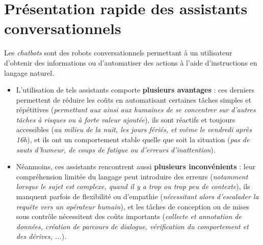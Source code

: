 	\minitoc
	
	
	\newpage
	\section{Présentation rapide des assistants conversationnels}
	\label{annex:B.1-ANNEXE-CHATBOTS-PRESENTATION}
	
		Les \textit{chatbots} sont des robots conversationnels permettant à un utilisateur d'obtenir des informations ou d'automatiser des actions à l'aide d'instructions en langage naturel.
		\begin{itemize}
			\item[\faThumbsUp] L'utilisation de tels assistants comporte \textbf{plusieurs avantages} :
			ces derniers permettent de réduire les coûts en automatisant certaines tâches simples et répétitives (\textit{permettant aux ainsi aux humaines de se concentrer sur d'autres tâches à risques ou à forte valeur ajoutée}),
			ils sont réactifs et toujours accessibles (\textit{au milieu de la nuit, les jours fériés, et même le vendredi après 16h}),
			et ils ont un comportement stable quelle que soit la situation (\textit{pas de sauts d'humeur, de coups de fatigue ou d'erreurs d'inattention}).
			\item[\faThumbsDown] Néanmoins, ces assistants rencontrent aussi \textbf{plusieurs inconvénients} :
			leur compréhension limitée du langage peut introduire des erreurs (\textit{notamment lorsque le sujet est complexe, quand il y a trop ou trop peu de contexte}),
			ils manquent parfois de flexibilité ou d'empathie (\textit{nécessitant alors d'escalader la requête vers un opérateur humain}),
			et les tâches de conception ou de mises sous contrôle nécessitent des coûts importants (\textit{collecte et annotation de données, création de parcours de dialogue, vérification du comportement et des dérives, ...}).
		\end{itemize}
		
